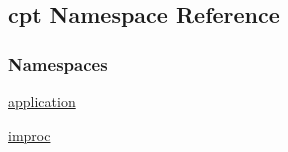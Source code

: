 \hypertarget{namespacecpt}{\subsection{cpt Namespace Reference}
\label{namespacecpt}
}
\subsubsection*{Namespaces}
\begin{DoxyCompactItemize}
\item 
\hyperlink{namespacecpt_1_1application}{application}
\item 
\hyperlink{namespacecpt_1_1improc}{improc}
\end{DoxyCompactItemize}
